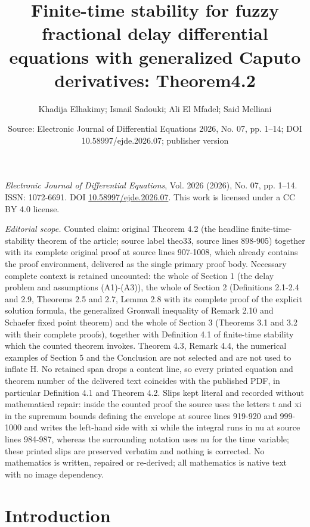\documentclass[10pt,a4paper]{amsart}
\title[Finite-time stability for fuzzy fractional delay differentia]{Finite-time stability for fuzzy fractional delay differential equations with generalized Caputo derivatives: Theorem4.2}
\author{Khadija Elhakimy; Ismail Sadouki; Ali El Mfadel; Said Melliani}
\date{Source: Electronic Journal of Differential Equations 2026, No. 07, pp. 1--14; DOI 10.58997/ejde.2026.07; publisher version}
\numberwithin{equation}{section}
\begin{document}
\maketitle
\noindent\emph{Electronic Journal of Differential Equations}, Vol. 2026 (2026), No. 07, pp. 1--14.\newline
ISSN: 1072-6691. DOI \href{https://doi.org/10.58997/ejde.2026.07}{10.58997/ejde.2026.07}. This work is licensed under a CC BY 4.0 license.\par\smallskip
\noindent\textit{Editorial scope.} Counted claim: original Theorem 4.2 (the headline finite-time-stability theorem of the article; source label theo33, source lines 898-905) together with its complete original proof at source lines 907-1008, which already contains the proof environment, delivered as the single primary proof body. Necessary complete context is retained uncounted: the whole of Section 1 (the delay problem and assumptions (A1)-(A3)), the whole of Section 2 (Definitions 2.1-2.4 and 2.9, Theorems 2.5 and 2.7, Lemma 2.8 with its complete proof of the explicit solution formula, the generalized Gronwall inequality of Remark 2.10 and Schaefer fixed point theorem) and the whole of Section 3 (Theorems 3.1 and 3.2 with their complete proofs), together with Definition 4.1 of finite-time stability which the counted theorem invokes. Theorem 4.3, Remark 4.4, the numerical examples of Section 5 and the Conclusion are not selected and are not used to inflate H. No retained span drops a content line, so every printed equation and theorem number of the delivered text coincides with the published PDF, in particular Definition 4.1 and Theorem 4.2. Slips kept literal and recorded without mathematical repair: inside the counted proof the source uses the letters t and xi in the supremum bounds defining the envelope at source lines 919-920 and 999-1000 and writes the left-hand side with xi while the integral runs in nu at source lines 984-987, whereas the surrounding notation uses nu for the time variable; these printed slips are preserved verbatim and nothing is corrected. No mathematics is written, repaired or re-derived; all mathematics is native text with no image dependency.
\section{Introduction}
\end{document}
